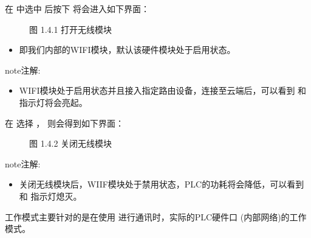 \documentclass[a4paper,10pt,english]{sphinxmanual}
\begin{document}
\sphinxAtStartPar
在  中选中  后按下  将会进入如下界面：

\begin{figure}[htbp]
\centering
\capstart

\noindent{}
\caption{图 1.4.1 打开无线模块}\label{\detokenize{operation_guide:id10}}\end{figure}
\begin{itemize}
\item {} 
\sphinxAtStartPar
{} 即我们内部的WIFI模块，默认该硬件模块处于启用状态。

\end{itemize}

\begin{sphinxadmonition}{note}{注解:}\begin{itemize}
\item {} 
\sphinxAtStartPar
WIFI模块处于启用状态并且接入指定路由设备，连接至云端后，可以看到  和  指示灯将会亮起。

\end{itemize}
\end{sphinxadmonition}

\sphinxAtStartPar
在  选择 ， 则会得到如下界面：

\begin{figure}[htbp]
\centering
\capstart

\noindent{}
\caption{图 1.4.2 关闭无线模块}\label{\detokenize{operation_guide:id11}}\end{figure}

\begin{sphinxadmonition}{note}{注解:}\begin{itemize}
\item {} 
\sphinxAtStartPar
关闭无线模块后，WIIF模块处于禁用状态，PLC的功耗将会降低，可以看到  和  指示灯熄灭。

\end{itemize}
\end{sphinxadmonition}

\sphinxAtStartPar
{}

\sphinxAtStartPar
工作模式主要针对的是在使用  进行通讯时，实际的PLC硬件口  (内部网络)的工作模式。
\end{document}
